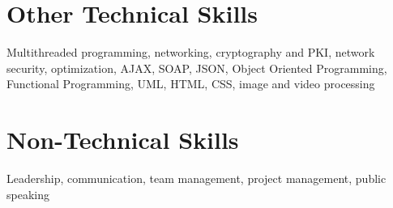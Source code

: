 \documentclass[margin,line]{resume}
\begin{document}
\begin{resume}
\section{\mysidestyle \textbf{Other Technical Skills}}
Multithreaded programming, networking, cryptography and PKI, network security,
optimization, AJAX, SOAP, JSON, Object Oriented Programming, Functional
Programming, UML, HTML, CSS, image and video processing

\section{\mysidestyle \textbf{Non-Technical Skills}}
Leadership, communication, team management, project management, public speaking

\newpage

\end{resume}
\end{document}
